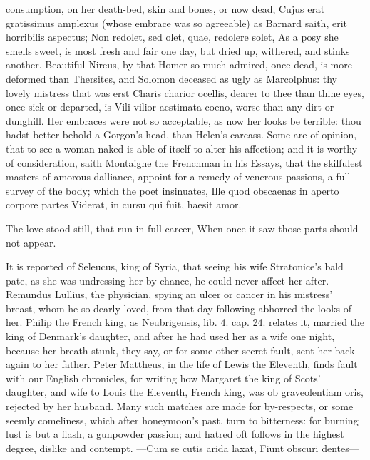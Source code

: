 {consumption, on her death-bed, skin and bones, or now dead, Cujus erat
gratissimus amplexus (whose embrace was so agreeable) as Barnard saith,
erit horribilis aspectus; Non redolet, sed olet, quae, redolere solet,
As a posy she smells sweet, is most fresh and fair one day, but dried
up, withered, and stinks another. Beautiful Nireus, by that Homer so
much admired, once dead, is more deformed than Thersites, and Solomon
deceased as ugly as Marcolphus: thy lovely mistress that was erst
Charis charior ocellis, dearer to thee than thine eyes, once sick
or departed, is Vili vilior aestimata coeno, worse than any dirt or
dunghill. Her embraces were not so acceptable, as now her looks be
terrible: thou hadst better behold a Gorgon's head, than Helen's
carcass.
Some are of opinion, that to see a woman naked is able of itself to
alter his affection; and it is worthy of consideration, saith
Montaigne the Frenchman in his Essays, that the skilfulest
masters of amorous dalliance, appoint for a remedy of venerous
passions, a full survey of the body; which the poet insinuates,
Ille quod obscaenas in aperto corpore partes
Viderat, in cursu qui fuit, haesit amor.

The love stood still, that run in full career,
When once it saw those parts should not appear.

It is reported of Seleucus, king of Syria, that seeing his wife
Stratonice's bald pate, as she was undressing her by chance, he could
never affect her after. Remundus Lullius, the physician, spying an
ulcer or cancer in his mistress' breast, whom he so dearly loved, from
that day following abhorred the looks of her. Philip the French king,
as Neubrigensis, lib. 4. cap. 24. relates it, married the king of
Denmark's daughter, and after he had used her as a wife one
night, because her breath stunk, they say, or for some other secret
fault, sent her back again to her father. Peter Mattheus, in the life
of Lewis the Eleventh, finds fault with our English chronicles,
for writing how Margaret the king of Scots' daughter, and wife to Louis
the Eleventh, French king, was ob graveolentiam oris, rejected by her
husband. Many such matches are made for by-respects, or some seemly
comeliness, which after honeymoon's past, turn to bitterness: for
burning lust is but a flash, a gunpowder passion; and hatred oft
follows in the highest degree, dislike and contempt.
---Cum se cutis arida laxat,
Fiunt obscuri dentes---

}
